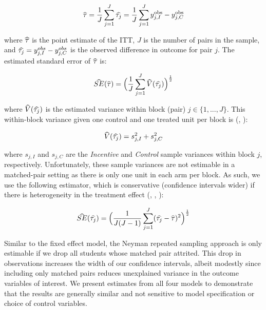 \documentclass[12pt]{article}
\newcommand\wh[1]{\hstretch{2}{\hat{\hstretch{.5}{#1}}}}
\begin{document}
\begin{equation} \label{neyman_spec}
	\wh{\tau} = \frac{1}{J}\sum_{j=1}^{J} \wh{\tau_j} = \frac{1}{J}\sum_{j=1}^{J} y^\text{obs}_{j,I} - y^\text{obs}_{j,C}
\end{equation}

where $\wh{\tau}$ is the point estimate of the ITT, $J$ is the number of pairs in the sample, and $\wh{\tau_j} = y^{obs}_{j,I} - y^{obs}_{j,C}$ is the observed difference in outcome for pair $j$. The estimated standard error of $\wh{\tau}$ \citep{imai2008, ir2015, ai2017} is:

\begin{equation} \label{se_neyman}
	\wh{SE}(\wh{\tau}) = \Big(\frac{1}{J}\sum_{j=1}^{J} \wh{V}(\wh{\tau_j}) \Big)^\frac{1}{2}
\end{equation}

where $\wh{V}(\wh{\tau_j})$ is the estimated variance within block (pair) $j\in \{1,...,J\}$. This within-block variance given one control and one treated unit per block is (\cite{ir2015}, \cite{ai2017}):

\begin{equation} \label{v_block}
	\wh{V}(\wh{\tau_j}) = s_{j, I}^2 + s_{j, C}^2
\end{equation}

where $s_{j, I}$ and $s_{j, C}$ are the \textit{Incentive} and \textit{Control} sample variances within block $j$, respectively. Unfortunately, these sample variances are not estimable in a matched-pair setting as there is only one unit in each arm per block. As such, we use the following estimator, which is conservative (confidence intervals wider) if there is heterogeneity in the treatment effect (\cite{imai2008}, \cite{ir2015}, \cite{ai2017}):

\begin{equation} \label{se_imai}
	\wh{SE}(\wh{\tau_j}) = \Big(\frac{1}{J(J-1)}\sum_{j=1}^{J} (\wh{\tau_j} - \wh{\tau})^2 \Big)^\frac{1}{2}
\end{equation}

Similar to the fixed effect model, the Neyman repeated sampling approach is only estimable if we drop all students whose matched pair attrited. This drop in observations increases the width of our confidence intervals, albeit modestly since including only matched pairs reduces unexplained variance in the outcome variables of interest. We present estimates from all four models to demonstrate that the results are generally similar and not sensitive to model specification or choice of control variables.
\end{document}
